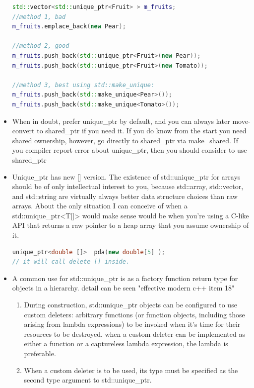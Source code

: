 \documentclass[a4paper,12pt,twoside]{book}
\begin{document}
\begin{itemize}
\begin{lstlisting}[frame=single, language=c++]
std::vector<std::unique_ptr<Fruit> > m_fruits;
//method 1, bad
m_fruits.emplace_back(new Pear);

//method 2, good
m_fruits.push_back(std::unique_ptr<Fruit>(new Pear));
m_fruits.push_back(std::unique_ptr<Fruit>(new Tomato));

//method 3, best using std::make_unique:
m_fruits.push_back(std::make_unique<Pear>());
m_fruits.push_back(std::make_unique<Tomato>());
\end{lstlisting}



\item When in doubt, prefer unique\_ptr by default, and you can always later move-convert to shared\_ptr if you need it. If you do know from the start you need shared ownership, however, go directly to shared\_ptr via make\_shared. If you compiler report error about unique\_ptr, then you should consider to use shared\_ptr


\item Unique\_ptr has new [] version. The existence of std::unique\_ptr for arrays should be of only intellectual interest to you, because std::array, std::vector, and std::string are virtually always better data structure choices than raw arrays. About the only situation I can conceive of when a std::unique\_ptr<T[]> would make sense would be when you're using a C-like API that returns a raw pointer to a heap array that you assume ownership of it.
\begin{lstlisting}[frame=single, language=c++]
unique_ptr<double []>  pda(new double[5] );
// it will call delete [] inside.
\end{lstlisting}



\item A common use for std::unique\_ptr is as a factory function return type for objects
in a hierarchy. detail can be seen "effective modern c++ item 18"
\begin{enumerate}
\item During construction, std::unique\_ptr objects can be configured to use custom deleters: arbitrary functions
(or function objects, including those arising from lambda expressions) to be invoked when it's time for their resources to be destroyed. when a custom deleter can be implemented as either a function or a captureless
lambda expression, the lambda is preferable.
\item When a custom deleter is to be used, its type must be specified as the second type argument to std::unique\_ptr.
\end{enumerate}


\end{itemize}
\end{document}
